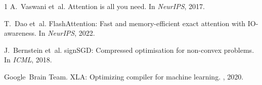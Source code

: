 \documentclass[10pt,twocolumn]{article}
\begin{document}

\begin{thebibliography}{1}
A.~Vaswani et~al.
\newblock Attention is all you need.
\newblock In {\em NeurIPS}, 2017.

T.~Dao et~al.
\newblock FlashAttention: Fast and memory-efficient exact attention with IO-awareness.
\newblock In {\em NeurIPS}, 2022.

J.~Bernstein et~al.
\newblock signSGD: Compressed optimisation for non-convex problems.
\newblock In {\em ICML}, 2018.

Google~Brain Team.
\newblock XLA: Optimizing compiler for machine learning.
, 2020.
\end{thebibliography}
\end{document}
